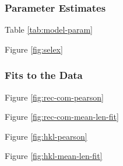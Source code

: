 \documentclass[11pt,
  english,
  a4paper,
]{article}
\begin{document}

\hypertarget{parameter-estimates}{%
\subsubsection{Parameter Estimates}\label{parameter-estimates}}

\leavevmode\tagmcend\tagstructend


Table \ref{tab:model-param}

\leavevmode\tagmcend\tagstructend\par


Figure \ref{fig:selex}

\leavevmode\tagmcend\tagstructend\par


\hypertarget{fits-to-the-data}{%
\subsubsection{Fits to the Data}\label{fits-to-the-data}}

\leavevmode\tagmcend\tagstructend


Figure \ref{fig:rec-com-pearson}

\leavevmode\tagmcend\tagstructend\par


Figure \ref{fig:rec-com-mean-len-fit}

\leavevmode\tagmcend\tagstructend\par


Figure \ref{fig:hkl-pearson}

\leavevmode\tagmcend\tagstructend\par


Figure \ref{fig:hkl-mean-len-fit}

\leavevmode\tagmcend\tagstructend\par

\end{document}
